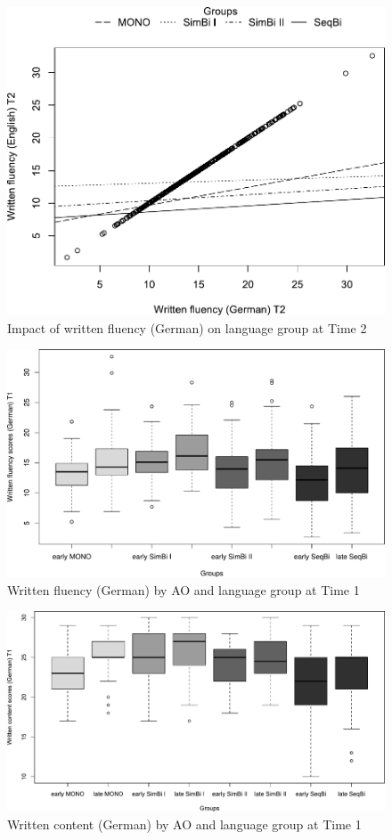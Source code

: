 \documentclass[output=paper,modfonts,nonflat,newtxmath]{langsci/langscibook}
\begin{document}
\begin{figure}%
\includegraphics[width=.75\textwidth]{figures/PfenningerFigure8.pdf}
\caption{\label{fig:pfenninger:8} Impact of written fluency (German) on language group at Time 2}
\end{figure}


\begin{figure}%
\includegraphics[width=\textwidth]{figures/PfenningerFigure9.pdf}
 \caption{\label{fig:pfenninger:9}Written fluency (German) by AO and language group at Time 1}
\end{figure}


\begin{figure}%
\includegraphics[width=\textwidth]{figures/PfenningerFigure10.pdf}
\caption{\label{fig:pfenninger:10} Written content (German) by AO and language group at Time 1}
\end{figure}
\end{document}
